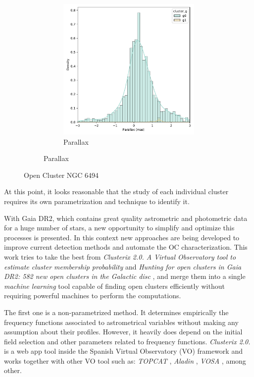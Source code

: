 \documentclass[11pt, a4paper, english]{book}
\begin{document}
\begin{figure}[htbp]
\begin{subfigure}{0.9\textwidth}
\begin{subfigure}[t]{0.45\textwidth}
      \includegraphics[width=\textwidth]{../figures/parallax_ngc_6494.pdf}
      \caption{Parallax}
      \label{fig:parallax_ngc_6494}
    \end{subfigure}
  \end{subfigure}
  \caption{Open Cluster NGC 6494}
\end{figure}

At this point, it looks reasonable that the study of each individual cluster requires its own parametrization and technique
to identify it.

With Gaia DR2, which contains great quality astrometric and photometric data for a huge number of stars,
a new opportunity to simplify and optimize this processes is presented.
In this context new approaches are being developed to improve current detection methods and automate the OC characterization.
This work tries to take the best from \emph{Clusterix 2.0. A Virtual Observatory tool to estimate cluster membership probability}
\cite{balaguer2020clusterix} and \emph{Hunting for open clusters in Gaia DR2: 582 new open clusters
in the Galactic disc} \cite{castro2020hunting}, and merge them into a single \emph{machine learning}
tool capable of finding open clusters efficiently without requiring powerful machines to perform the computations.

The first one is a non-parametrized method. It determines empirically the frequency functions associated to astrometrical variables
without making any assumption about their profiles. However, it heavily does depend on the initial field selection and other
parameters related to frequency functions. \emph{Clusterix 2.0.} is a web app tool inside the Spanish Virtual Observatory
(VO) framework and works together with other VO tool such as:
\emph{TOPCAT} \cite{taylor2005topcat},
\emph{Aladin} \cite{bonnarel2000aladin},
\emph{VOSA} \cite{bayo2008vosa}, among other.
\end{document}
